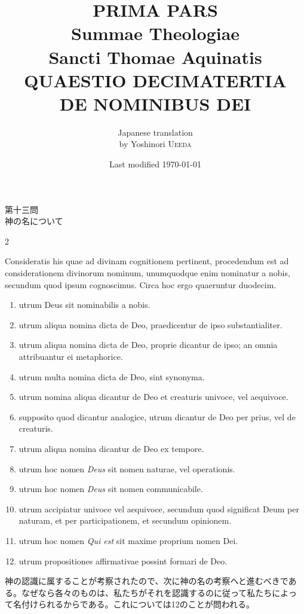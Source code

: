 \documentclass[paper=a4paper,fontsize=10pt,jafontsize=9pt,titlepage]{jlreq}
\title{{\bfseries PRIMA PARS}\\Summae Theologiae\\Sancti Thomae
Aquinatis\\{\sffamily QUAESTIO DECIMATERTIA}\\DE NOMINIBUS DEI}
\author{Japanese translation\\by Yoshinori {\scshape Ueeda}}
\date{Last modified \today}
\begin{document}
\maketitle

\begin{center}
{\Large 第十三問\\神の名について}
\end{center}

\begin{paracol}{2}

{\LARGE C}onsideratis his quae ad divinam cognitionem pertinent,
procedendum est ad considerationem divinorum nominum, unumquodque enim
nominatur a nobis, secundum quod ipsum cognoscimus. Circa hoc ergo
quaeruntur duodecim.

\begin{enumerate}
 \item utrum Deus sit nominabilis a nobis.
 \item utrum aliqua nomina dicta de Deo, praedicentur de ipso
substantialiter.
 \item utrum aliqua nomina dicta de Deo, proprie dicantur de ipso; an
omnia attribuantur ei metaphorice.
 \item utrum multa nomina dicta de Deo, sint synonyma.
 \item utrum nomina aliqua dicantur de Deo et creaturis univoce, vel
aequivoce.
 \item supposito quod dicantur analogice, utrum dicantur de Deo per
prius, vel de creaturis.
 \item utrum aliqua nomina dicantur de Deo ex tempore.
 \item utrum hoc nomen {\itshape Deus} sit nomen naturae, vel operationis.
 \item utrum hoc nomen {\itshape Deus} sit nomen communicabile.
 \item utrum accipiatur univoce vel aequivoce, secundum quod
significat Deum per naturam, et per participationem, et secundum
opinionem.
 \item utrum hoc nomen {\itshape Qui est} sit maxime proprium nomen Dei.
 \item utrum
propositiones affirmativae possint formari de Deo.
\end{enumerate}

\switchcolumn

神の認識に属することが考察されたので、次に神の名の考察へと進むべきであ
る。なぜなら各々のものは、私たちがそれを認識するのに従って私たちによっ
て名付けられるからである。これについては12のことが問われる。


\end{paracol}
\end{document}
